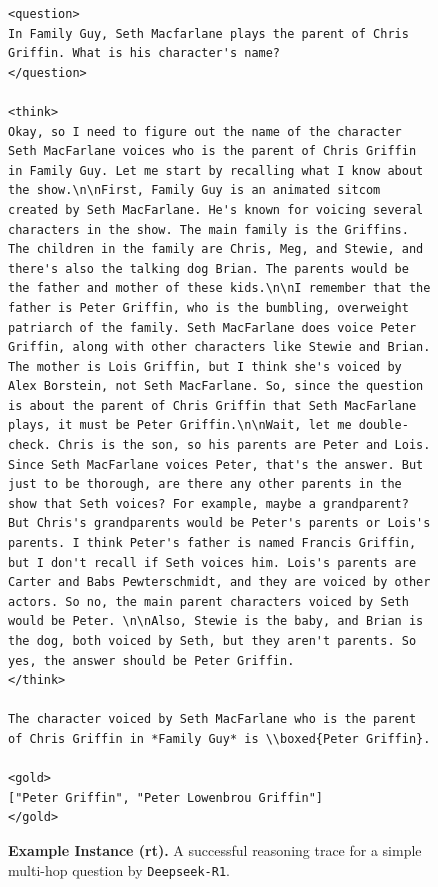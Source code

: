 \documentclass[11pt]{article}
\newcommand{\rone}{\texttt{Deepseek-R1}}
\begin{document}
\begin{figure}[t]
\centering
\begin{tcolorbox}[title=Deepseek-R1 Example (\textbf{rt}), promptstyle]
\lstset{
    basicstyle=\normalfont\sffamily\scriptsize,
    breaklines=true,
    frame=none,
    columns=fullflexible,
}
\begin{lstlisting}[linewidth=\linewidth]
<question>
In Family Guy, Seth Macfarlane plays the parent of Chris Griffin. What is his character's name?
</question>

<think>
Okay, so I need to figure out the name of the character Seth MacFarlane voices who is the parent of Chris Griffin in Family Guy. Let me start by recalling what I know about the show.\n\nFirst, Family Guy is an animated sitcom created by Seth MacFarlane. He's known for voicing several characters in the show. The main family is the Griffins. The children in the family are Chris, Meg, and Stewie, and there's also the talking dog Brian. The parents would be the father and mother of these kids.\n\nI remember that the father is Peter Griffin, who is the bumbling, overweight patriarch of the family. Seth MacFarlane does voice Peter Griffin, along with other characters like Stewie and Brian. The mother is Lois Griffin, but I think she's voiced by Alex Borstein, not Seth MacFarlane. So, since the question is about the parent of Chris Griffin that Seth MacFarlane plays, it must be Peter Griffin.\n\nWait, let me double-check. Chris is the son, so his parents are Peter and Lois. Since Seth MacFarlane voices Peter, that's the answer. But just to be thorough, are there any other parents in the show that Seth voices? For example, maybe a grandparent? But Chris's grandparents would be Peter's parents or Lois's parents. I think Peter's father is named Francis Griffin, but I don't recall if Seth voices him. Lois's parents are Carter and Babs Pewterschmidt, and they are voiced by other actors. So no, the main parent characters voiced by Seth would be Peter. \n\nAlso, Stewie is the baby, and Brian is the dog, both voiced by Seth, but they aren't parents. So yes, the answer should be Peter Griffin.
</think>

The character voiced by Seth MacFarlane who is the parent of Chris Griffin in *Family Guy* is \\boxed{Peter Griffin}.

<gold>
["Peter Griffin", "Peter Lowenbrou Griffin"]
</gold>
\end{lstlisting}
\end{tcolorbox}
    \caption{\textbf{Example Instance (\textbf{rt}).} A successful reasoning trace for a simple multi-hop question by \rone{}.}
    \label{fig:ex-reasoning-trace-r1}
\end{figure}
\end{document}
